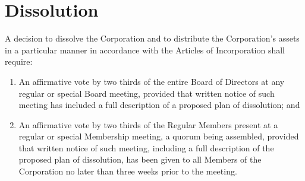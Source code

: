 \section{Dissolution}
\label{sec:dissolution}
\noindent
A decision to dissolve the Corporation and to distribute the
Corporation’s assets in a particular manner in accordance with the
Articles of Incorporation shall require:
\begin{enumerate}
  \item An affirmative vote by two thirds of the entire Board of
    Directors at any regular or special Board meeting, provided that
    written notice of such meeting has included a full description of
    a proposed plan of dissolution; and
  \item An affirmative vote by two thirds of the Regular Members
    present at a regular or special Membership meeting, a quorum being
    assembled, provided that written notice of such meeting, including
    a full description of the proposed plan of dissolution, has been
    given to all Members of the Corporation no later than three weeks
    prior to the meeting.
\end{enumerate}
